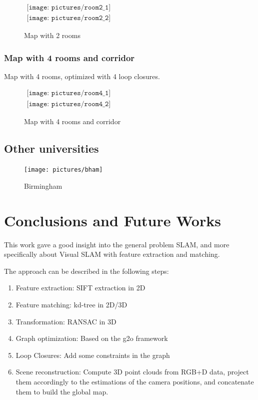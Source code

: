 \begin{figure}[h!]
\centering$
\begin{array}{c}
\texttt{[image: pictures/room2\_1]}\\
\texttt{[image: pictures/room2\_2]}
\end{array}$
\caption{Map with 2 rooms}
\end{figure}

\clearpage

\subsection{Map with 4 rooms and corridor}
Map with 4 rooms, optimized with 4 loop closures.

\begin{figure}[h]
\centering$
\begin{array}{c}
\texttt{[image: pictures/room4\_1]}\\
\texttt{[image: pictures/room4\_2]}
\end{array}$
\caption{Map with 4 rooms and corridor}
\end{figure}

\clearpage

\section{Other universities}

\begin{figure}[h]
\centering
\texttt{[image: pictures/bham]}
\caption{Birmingham}
\end{figure}

\chapter{Conclusions and Future Works}
\label{chap:conclusion}

This work gave a good insight into the general problem SLAM, and more specifically about Visual SLAM with feature extraction and matching.

The approach can be described in the following steps:
\begin{enumerate}
\item Feature extraction: SIFT extraction in 2D
\item Feature matching: kd-tree in 2D/3D
\item Transformation: RANSAC in 3D
\item Graph optimization: Based on the g2o framework
\item Loop Closures: Add some constraints in the graph
\item Scene reconstruction: Compute 3D point clouds from RGB+D data, project them accordingly to the estimations of the camera positions, and concatenate them to build the global map.
\end{enumerate}

